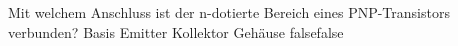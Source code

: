     {Mit welchem Anschluss ist der n-dotierte Bereich eines PNP-Transistors verbunden?}
    {Basis}
    {Emitter}
    {Kollektor}
    {Gehäuse}
    {false}{false}
